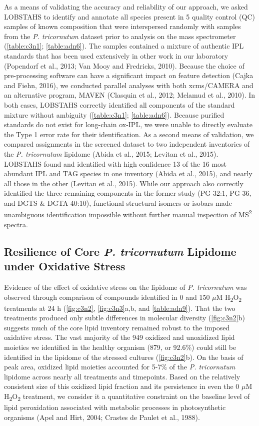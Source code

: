 As a means of validating the accuracy and reliability of our approach, we asked LOBSTAHS to identify and annotate all species present in 5 quality control (QC) samples of known composition that were interspersed randomly with samples from the \emph{P. tricornutum} dataset prior to analysis on the mass spectrometer (\autoref{table:c3n1}; \autoref{table:adn6}). The samples contained a mixture of authentic IPL standards that has been used extensively in other work in our laboratory (Popendorf et al., 2013; Van Mooy and Fredricks, 2010). Because the choice of pre-processing software can have a significant impact on feature detection (Cajka and Fiehn, 2016), we conducted parallel analyses with both xcms/CAMERA and an alternative program, MAVEN (Clasquin et al., 2012; Melamud et al., 2010). In both cases, LOBSTAHS correctly identified all components of the standard mixture without ambiguity (\autoref{table:c3n1}; \autoref{table:adn6}). Because purified standards do not exist for long-chain ox-IPL, we were unable to directly evaluate the Type 1 error rate for their identification. As a second means of validation, we compared assignments in the screened dataset to two independent inventories of the \emph{P. tricornutum} lipidome (Abida et al., 2015; Levitan et al., 2015). LOBSTAHS found and identified with high confidence 13 of the 16 most abundant IPL and TAG species in one inventory (Abida et al., 2015), and nearly all those in the other (Levitan et al., 2015). While our approach also correctly identified the three remaining components in the former study (PG 32:1, PG 36, and DGTS \& DGTA 40:10), functional structural isomers or isobars made unambiguous identification impossible without further manual inspection of MS\textsuperscript{2} spectra.

\subsection{Resilience of Core \emph{P. tricornutum} Lipidome under Oxidative Stress}

Evidence of the effect of oxidative stress on the lipidome of \emph{P. tricornutum} was observed through comparison of compounds identified in 0 and 150 $\mu$M H\textsubscript{2}O\textsubscript{2} treatments at 24 h (\autoref{fig:c3n2}, \autoref{fig:c3n3}a,b, and \autoref{table:adn9}). That the two treatments produced only subtle differences in molecular diversity (\autoref{fig:c3n2}b) suggests much of the core lipid inventory remained robust to the imposed oxidative stress. The vast majority of the 949 oxidized and unoxidized lipid moieties we identified in the healthy organism (879, or 92.6\%) could still be identified in the lipidome of the stressed cultures (\autoref{fig:c3n2}b). On the basis of peak area, oxidized lipid moieties accounted for 5-7\% of the \emph{P. tricornutum} lipidome across nearly all treatments and timepoints. Based on the relatively consistent size of this oxidized lipid fraction and its persistence in even the 0 $\mu$M H\textsubscript{2}O\textsubscript{2} treatment, we consider it a quantitative constraint on the baseline level of lipid peroxidation associated with metabolic processes in photosynthetic organisms (Apel and Hirt, 2004; Crastes de Paulet et al., 1988).

